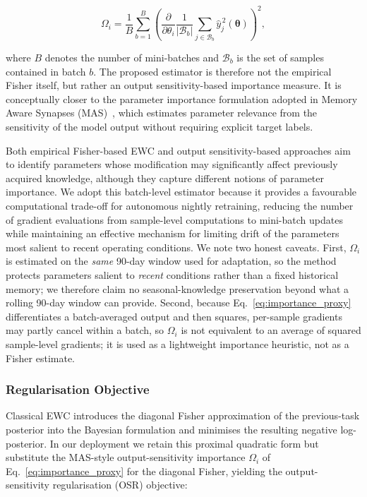 \documentclass[journal]{IEEEtran}
\begin{document}
\begin{equation}
    \Omega_i
    =
    \frac{1}{B}
    \sum_{b=1}^{B}
    \left(
    \frac{\partial}{\partial \theta_i}
    \frac{1}{|\mathcal{B}_b|}
    \sum_{j\in\mathcal{B}_b}
    \hat{y}_{j}^{\,2}(\boldsymbol{\theta})
    \right)^2 ,
    \label{eq:importance_proxy}
\end{equation}

where $B$ denotes the number of mini-batches and $\mathcal{B}_b$ is the
set of samples contained in batch $b$. The proposed estimator is
therefore not the empirical Fisher itself, but rather an output
sensitivity-based importance measure. It is conceptually closer to the
parameter importance formulation adopted in Memory Aware Synapses
(MAS)~\cite{aljundi2018memory}, which estimates parameter relevance from
the sensitivity of the model output without requiring explicit target
labels.

Both empirical Fisher-based EWC and output sensitivity-based approaches
aim to identify parameters whose modification may significantly affect
previously acquired knowledge, although they capture different notions
of parameter importance. We adopt this batch-level estimator because it
provides a favourable computational trade-off for autonomous nightly
retraining, reducing the number of gradient evaluations from
sample-level computations to mini-batch updates while maintaining an
effective mechanism for limiting drift of the parameters most salient to
recent operating conditions. We note two honest caveats. First,
$\Omega_i$ is estimated on the \emph{same} 90-day window used for
adaptation, so the method protects parameters salient to \emph{recent}
conditions rather than a fixed historical memory; we therefore claim no
seasonal-knowledge preservation beyond what a rolling 90-day window can
provide. Second, because Eq.~\eqref{eq:importance_proxy} differentiates a
batch-averaged output and then squares, per-sample gradients may partly
cancel within a batch, so $\Omega_i$ is not equivalent to an average of
squared sample-level gradients; it is used as a lightweight importance
heuristic, not as a Fisher estimate.
\subsubsection{Regularisation Objective}
\label{sec:ewc_loss}

Classical EWC introduces the diagonal Fisher approximation of the
previous-task posterior into the Bayesian formulation and minimises the
resulting negative log-posterior. In our deployment we retain this
proximal quadratic form but substitute the MAS-style output-sensitivity
importance $\Omega_i$ of Eq.~\eqref{eq:importance_proxy} for the diagonal
Fisher, yielding the output-sensitivity regularisation (OSR) objective:
\end{document}

